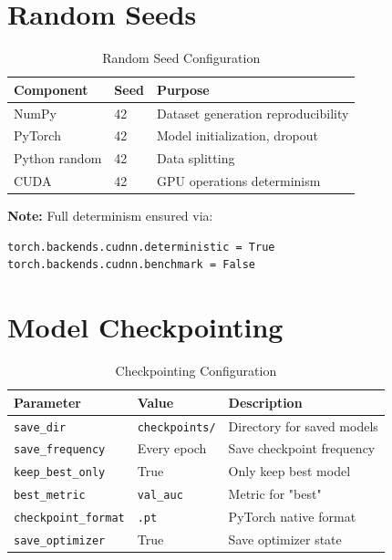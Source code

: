 \section{Random Seeds}

\begin{table}[H]
\centering
\begin{tabular}{llp{7cm}}
\toprule
\textbf{Component} & \textbf{Seed} & \textbf{Purpose} \\
\midrule
NumPy & 42 & Dataset generation reproducibility \\
PyTorch & 42 & Model initialization, dropout \\
Python random & 42 & Data splitting \\
CUDA & 42 & GPU operations determinism \\
\bottomrule
\end{tabular}
\caption{Random Seed Configuration}
\end{table}

\textbf{Note:} Full determinism ensured via:
\begin{verbatim}
torch.backends.cudnn.deterministic = True
torch.backends.cudnn.benchmark = False
\end{verbatim}

\section{Model Checkpointing}

\begin{table}[H]
\centering
\begin{tabular}{llp{7cm}}
\toprule
\textbf{Parameter} & \textbf{Value} & \textbf{Description} \\
\midrule
\texttt{save\_dir} & \texttt{checkpoints/} & Directory for saved models \\
\texttt{save\_frequency} & Every epoch & Save checkpoint frequency \\
\texttt{keep\_best\_only} & True & Only keep best model \\
\texttt{best\_metric} & \texttt{val\_auc} & Metric for "best" \\
\texttt{checkpoint\_format} & \texttt{.pt} & PyTorch native format \\
\texttt{save\_optimizer} & True & Save optimizer state \\
\bottomrule
\end{tabular}
\caption{Checkpointing Configuration}
\end{table}

